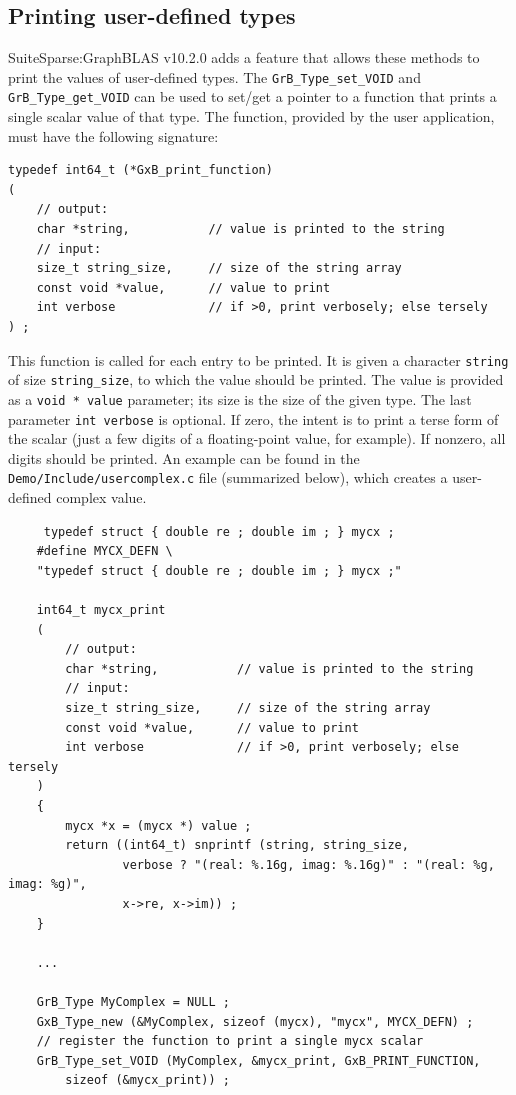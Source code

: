 \subsection{Printing user-defined types}
\label{fprint_user}

SuiteSparse:GraphBLAS v10.2.0 adds a feature that allows these methods to
print the values of user-defined types.  The \verb'GrB_Type_set_VOID'
and \verb'GrB_Type_get_VOID' can be used to set/get a pointer to a function
that prints a single scalar value of that type.  The function, provided
by the user application, must have the following signature:

\begin{mdframed}[userdefinedwidth=6in]
{\footnotesize
\begin{verbatim}
typedef int64_t (*GxB_print_function)
(
    // output:
    char *string,           // value is printed to the string
    // input:
    size_t string_size,     // size of the string array
    const void *value,      // value to print
    int verbose             // if >0, print verbosely; else tersely
) ;
\end{verbatim} } \end{mdframed}

This function is called for each entry to be printed.  It is given a character
\verb'string' of size \verb'string_size', to which the value should be printed.
The value is provided as a \verb'void * value' parameter; its size is the size
of the given type.  The last parameter \verb'int verbose' is optional.  If
zero, the intent is to print a terse form of the scalar (just a few digits of a
floating-point value, for example).  If nonzero, all digits should be printed.
An example can be found in the \verb'Demo/Include/usercomplex.c' file
(summarized below), which creates a user-defined complex value.

{\footnotesize
\begin{verbatim}
     typedef struct { double re ; double im ; } mycx ;
    #define MYCX_DEFN \
    "typedef struct { double re ; double im ; } mycx ;"

    int64_t mycx_print
    (
        // output:
        char *string,           // value is printed to the string
        // input:
        size_t string_size,     // size of the string array
        const void *value,      // value to print
        int verbose             // if >0, print verbosely; else tersely
    )
    {
        mycx *x = (mycx *) value ;
        return ((int64_t) snprintf (string, string_size,
                verbose ? "(real: %.16g, imag: %.16g)" : "(real: %g, imag: %g)",
                x->re, x->im)) ;
    }

    ...

    GrB_Type MyComplex = NULL ;
    GxB_Type_new (&MyComplex, sizeof (mycx), "mycx", MYCX_DEFN) ;
    // register the function to print a single mycx scalar
    GrB_Type_set_VOID (MyComplex, &mycx_print, GxB_PRINT_FUNCTION,
        sizeof (&mycx_print)) ;
\end{verbatim} }

